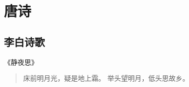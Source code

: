 \chapter{唐诗}

\section{李白诗歌}

《静夜思》\citep{李白:静夜思}
\begin{verse}
床前明月光，疑是地上霜。
举头望明月，低头思故乡。    
\end{verse}
 




